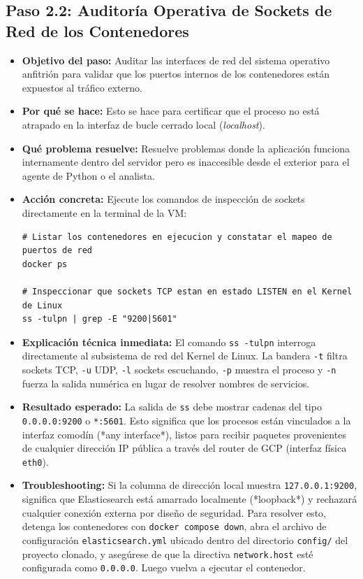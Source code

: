 \documentclass[
  coursetitle={Cómputo Nube y Tecnologías Emergentes},
  coursehours={96},
  coursedate={Verano 2026},
  doctype={Práctica},
  otherlangs={english,french},
  authorname={Lázaro},
  authorsurname={Bustio-Martínez},
  authortitle={PhD},
  role={Profesor Investigador},
  email={lbustio@inaoe.mx},
  phone={5559504000},
  ext={7459},
  institution={Instituto Nacional de Astrofísica, Óptica y Electrónica (INAOE)},
  department={Maestría en Ciencias en Tecnologías de Seguridad},
  address={Luis Enrique Erro 1, Sta. Ma. Tonantzintla, San Andrés Cholula, CP 72840, Puebla, México},
  margin={0.5in}
]{../../lbustio_lecture_notes}
\begin{document}
\subsection{Paso 2.2: Auditoría Operativa de Sockets de Red de los Contenedores}

\begin{itemize}
    \item \textbf{Objetivo del paso:} Auditar las interfaces de red del sistema operativo anfitrión para validar que los puertos internos de los contenedores están expuestos al tráfico externo.
    \item \textbf{Por qué se hace:} Esto se hace para certificar que el proceso no está atrapado en la interfaz de bucle cerrado local (\textit{localhost}).
    \item \textbf{Qué problema resuelve:} Resuelve problemas donde la aplicación funciona internamente dentro del servidor pero es inaccesible desde el exterior para el agente de Python o el analista.
    \item \textbf{Acción concreta:} Ejecute los comandos de inspección de sockets directamente en la terminal de la VM:
    
\begin{verbatim}
# Listar los contenedores en ejecucion y constatar el mapeo de puertos de red
docker ps

# Inspeccionar que sockets TCP estan en estado LISTEN en el Kernel de Linux
ss -tulpn | grep -E "9200|5601"
\end{verbatim}

    \item \textbf{Explicación técnica inmediata:} El comando \texttt{ss -tulpn} interroga directamente al subsistema de red del Kernel de Linux. La bandera \texttt{-t} filtra sockets TCP, \texttt{-u} UDP, \texttt{-l} sockets escuchando, \texttt{-p} muestra el proceso y \texttt{-n} fuerza la salida numérica en lugar de resolver nombres de servicios.
    
    \item \textbf{Resultado esperado:} La salida de \texttt{ss} debe mostrar cadenas del tipo \texttt{0.0.0.0:9200} o \texttt{*:5601}. Esto significa que los procesos están vinculados a la interfaz comodín (*any interface*), listos para recibir paquetes provenientes de cualquier dirección IP pública a través del router de GCP (interfaz física \texttt{eth0}).
    
    \item \textbf{Troubleshooting:} Si la columna de dirección local muestra \texttt{127.0.0.1:9200}, significa que Elasticsearch está amarrado localmente (*loopback*) y rechazará cualquier conexión externa por diseño de seguridad. Para resolver esto, detenga los contenedores con \texttt{docker compose down}, abra el archivo de configuración \texttt{elasticsearch.yml} ubicado dentro del directorio \texttt{config/} del proyecto clonado, y asegúrese de que la directiva \texttt{network.host} esté configurada como \texttt{0.0.0.0}. Luego vuelva a ejecutar el contenedor.
\end{itemize}
\end{document}
